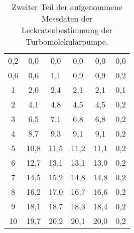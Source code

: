 \begin{table}[htp]
\begin{center}
\begin{tabular}{c|ccc|cc}
			          0,2           &          0,0          &          0,0          &          0,0          &            0,0            &            0,0             \\
			          0,6           &          0,6          &          1,1          &          0,9          &            0,9            &            0,2             \\
			           1            &          2,0          &          2,4          &          2,1          &            2,1            &            0,1             \\
			           2            &          4,1          &          4,8          &          4,5          &            4,5            &            0,2             \\
			           3            &          6,5          &          7,1          &          6,8          &            6,8            &            0,2             \\
			           4            &          8,7          &          9,3          &          9,1          &            9,1            &            0,2             \\
			           5            &         10,8          &         11,5          &         11,2          &           11,1            &            0,2             \\
			           6            &         12,7          &         13,1          &         13,1          &           13,0            &            0,2             \\
			           7            &         14,5          &         15,2          &         14,8          &           14,8            &            0,2             \\
			           8            &         16,2          &         17,0          &         16,7          &           16,6            &            0,2             \\
			           9            &         18,1          &         18,7          &         18,3          &           18,4            &            0,2             \\
			          10            &         19,7          &         20,2          &         20,1          &           20,0            &            0,2             \\ \bottomrule
		\end{tabular}
		\caption{Zweiter Teil der aufgenommene Messdaten der Leckratenbestimmung der Turbomolekularpumpe.}
		\label{tab10}
	\end{center}
\end{table}
